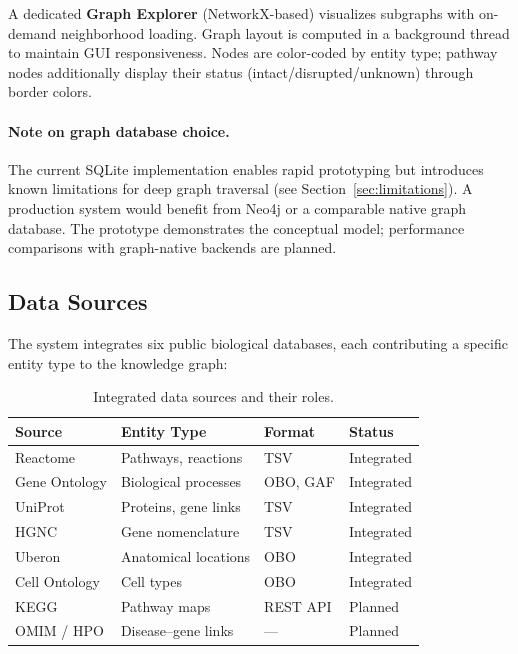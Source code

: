 \documentclass[12pt,a4paper]{article}
\begin{document}
A dedicated \textbf{Graph Explorer} (NetworkX-based) visualizes subgraphs with on-demand neighborhood loading. Graph layout is computed in a background thread to maintain GUI responsiveness. Nodes are color-coded by entity type; pathway nodes additionally display their status (intact/disrupted/unknown) through border colors.

\paragraph{Note on graph database choice.} The current SQLite implementation enables rapid prototyping but introduces known limitations for deep graph traversal (see Section~\ref{sec:limitations}). A production system would benefit from Neo4j or a comparable native graph database. The prototype demonstrates the conceptual model; performance comparisons with graph-native backends are planned.

\subsection{Data Sources}
\label{sec:datasources}

The system integrates six public biological databases, each contributing a specific entity type to the knowledge graph:

\begin{table}[H]
\centering
\caption{Integrated data sources and their roles.}
\label{tab:datasources}
\small
\begin{tabularx}{\textwidth}{@{}YYll@{}}
\toprule
\textbf{Source} & \textbf{Entity Type} & \textbf{Format} & \textbf{Status} \\
\midrule
Reactome \citep{Fabregat2018} & Pathways, reactions & TSV & Integrated \\
Gene Ontology \citep{Ashburner2000} & Biological processes & OBO, GAF & Integrated \\
UniProt \citep{UniProt2023} & Proteins, gene links & TSV & Integrated \\
HGNC \citep{Braschi2019} & Gene nomenclature & TSV & Integrated \\
Uberon \citep{Mungall2012} & Anatomical locations & OBO & Integrated \\
Cell Ontology \citep{Diehl2016} & Cell types & OBO & Integrated \\
KEGG \citep{Kanehisa2023} & Pathway maps & REST API & Planned \\
OMIM \citep{Amberger2019} / HPO \citep{Robinson2008} & Disease--gene links & --- & Planned \\
\bottomrule
\end{tabularx}
\end{table}
\end{document}
